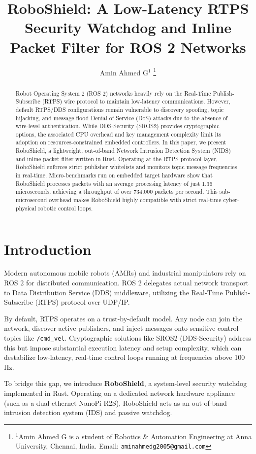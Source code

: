 \documentclass[letterpaper, 10 pt, conference]{ieeeconf}
\title{\LARGE \bf
RoboShield: A Low-Latency RTPS Security Watchdog and Inline Packet Filter for ROS 2 Networks
}
\author{Amin Ahmed G$^{1}$
\thanks{$^{1}$Amin Ahmed G is a student of Robotics \& Automation Engineering at Anna University, Chennai, India. Email: {\tt\small aminahmedg2005@gmail.com}}
}
\begin{document}
\maketitle
\thispagestyle{empty}
\pagestyle{empty}

\begin{abstract}
Robot Operating System 2 (ROS 2) networks heavily rely on the Real-Time Publish-Subscribe (RTPS) wire protocol to maintain low-latency communications. However, default RTPS/DDS configurations remain vulnerable to discovery spoofing, topic hijacking, and message flood Denial of Service (DoS) attacks due to the absence of wire-level authentication. While DDS-Security (SROS2) provides cryptographic options, the associated CPU overhead and key management complexity limit its adoption on resources-constrained embedded controllers. In this paper, we present RoboShield, a lightweight, out-of-band Network Intrusion Detection System (NIDS) and inline packet filter written in Rust. Operating at the RTPS protocol layer, RoboShield enforces strict publisher whitelists and monitors topic message frequencies in real-time. Micro-benchmarks run on embedded target hardware show that RoboShield processes packets with an average processing latency of just 1.36 microseconds, achieving a throughput of over 734,000 packets per second. This sub-microsecond overhead makes RoboShield highly compatible with strict real-time cyber-physical robotic control loops.
\end{abstract}

\section{Introduction}
Modern autonomous mobile robots (AMRs) and industrial manipulators rely on ROS 2 for distributed communication. ROS 2 delegates actual network transport to Data Distribution Service (DDS) middleware, utilizing the Real-Time Publish-Subscribe (RTPS) protocol over UDP/IP. 

By default, RTPS operates on a trust-by-default model. Any node can join the network, discover active publishers, and inject messages onto sensitive control topics like \texttt{/cmd\_vel}. Cryptographic solutions like SROS2 (DDS-Security) address this but impose substantial execution latency and setup complexity, which can destabilize low-latency, real-time control loops running at frequencies above 100 Hz.

To bridge this gap, we introduce \textbf{RoboShield}, a system-level security watchdog implemented in Rust. Operating on a dedicated network hardware appliance (such as a dual-ethernet NanoPi R2S), RoboShield acts as an out-of-band intrusion detection system (IDS) and passive watchdog.
\end{document}
